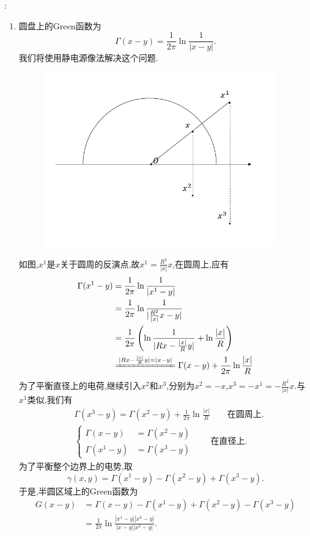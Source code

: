 \documentclass[12pt, a4paper]{ctexbook}
\begin{document}
    \songti{}:\\
    
    \begin{enumerate}
        \item 圆盘上的Green函数为$$
        \Gamma(x-y)=\frac{1}{2\pi}\ln \frac{1}{|x-y|}. $$
        我们将使用静电源像法解决这个问题.
        \begin{figure}[htbp]
            \centering
            \includegraphics[width=10cm]{PDE1_4_9_1.jpg}
        \end{figure}
        如图,$x^1$是$x$关于圆周的反演点,故$x^1=\frac{R^2}{|x|}x$,在圆周上,应有
        \begin{align*}
        \Gamma(x^1-y)&=\frac{1}{2\pi}\ln \frac{1}{|x^1-y|}\\
        &=\frac{1}{2\pi}\ln \frac{1}{|\frac{R^2}{|x|}x-y|}\\
        &=\frac{1}{2\pi} \left( \ln \frac{1}{|Rx-\frac{|x|}{R}y|}+\ln\frac{|x|}{R} \right)\\
        &\xlongequal{|Rx-\frac{|x|}{R}y|=|x-y|}\Gamma(x-y)+\frac{1}{2\pi}\ln\frac{|x|}{R}
        \end{align*}
        为了平衡直径上的电荷,继续引入$x^2$和$x^3$,分别为$x^2=-x$,$x^3=-x^1=-\frac{R^2}{|x|}x$.与$x^1$类似,我们有
        \begin{align*}
        &\Gamma(x^3-y)=\Gamma(x^2-y)+\frac{1}{2\pi}\ln\frac{|x|}{R} \qquad \text{在圆周上}.\\
        &\begin{cases}
        \Gamma(x-y)&=\Gamma(x^2-y) \\
        \Gamma(x^1-y)&=\Gamma(x^3-y)
        \end{cases}\qquad \text{在直径上}.
        \end{align*}
        为了平衡整个边界上的电势,取$$
        \gamma(x,y)=\Gamma(x^1-y)-\Gamma(x^2-y)+\Gamma(x^3-y). $$
        于是,半圆区域上的Green函数为\begin{align*}
        G(x-y)&=\Gamma(x-y)-\Gamma(x^1-y)+\Gamma(x^2-y)-\Gamma(x^3-y)\\
        &=\frac{1}{2\pi}\ln\frac{|x^1-y||x^3-y|}{|x-y||x^2-y|}.
        \end{align*}
        

\end{enumerate}
\end{document}
